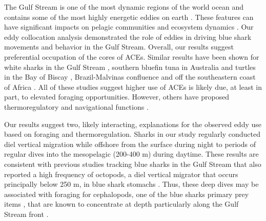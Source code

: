 The Gulf Stream is one of the most dynamic regions of the world ocean and contains some of the most highly energetic eddies on earth \citep{Chelton2011}. These features can have significant impacts on pelagic communities \citep{Gaube2017DSR} and ecosystem dynamics \citep{Davis1985, Boyd1986, Gaube2018}. Our eddy collocation analysis demonstrated the role of eddies in driving blue shark movements and behavior in the Gulf Stream. Overall, our results suggest preferential occupation of the cores of ACEs. Similar results have been shown for white sharks in the Gulf Stream \citep{Gaube2018}, southern bluefin tuna in Australia \citep{Hobday2014} and turtles in the Bay of Biscay \citep{Doyle2008}, Brazil-Malvinas confluence \citep{Gaube2017} and off the southeastern coast of Africa \citep{Luschi2003}. All of these studies suggest higher use of ACEs is likely due, at least in part, to elevated foraging opportunities. However, others have proposed thermoregulatory \citep{Campana2011, Gaube2018, Gaube2017} and navigational functions \citep{Carey1990}.


Our results suggest two, likely interacting, explanations for the observed eddy use based on foraging and thermoregulation. Sharks in our study regularly conducted diel vertical migration while offshore from the surface during night to periods of regular dives into the mesopelagic (200-400 m) during daytime. These results are consistent with previous studies tracking blue sharks in the Gulf Stream that also reported a high frequency of octopods, a diel vertical migrator that occurs principally below 250 m, in blue shark stomachs \citep{Carey1990}. Thus, these deep dives may be associated with foraging for cephalopods, one of the blue sharks primary prey items \citep{Clarke1974, Henderson2001}, that are known to concentrate at depth particularly along the Gulf Stream front \citep{Vovk1978, Fedulov1986, Dawe1985}. 

